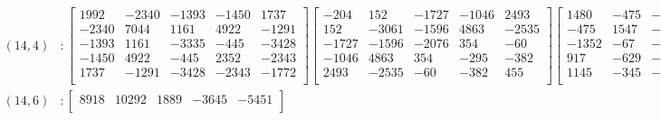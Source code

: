 \documentclass[12pt]{amsart}
\theoremstyle{plain}
\theoremstyle{definition}
\begin{document}
\begin{landscape}
\thispagestyle{empty}
\tiny
\begin{align*} 
(14,4) &:
\begin{bmatrix}
1992  &   -2340  &   -1393  &   -1450  &   1737  \\ 
 -2340  &   7044  &   1161  &   4922  &   -1291  \\ 
 -1393  &   1161  &   -3335  &   -445  &   -3428  \\ 
 -1450  &   4922  &   -445  &   2352  &   -2343  \\ 
 1737  &   -1291  &   -3428  &   -2343  &   -1772  \\ 
\end{bmatrix}
\begin{bmatrix}
-204  &   152  &   -1727  &   -1046  &   2493  \\ 
 152  &   -3061  &   -1596  &   4863  &   -2535  \\ 
 -1727  &   -1596  &   -2076  &   354  &   -60  \\ 
 -1046  &   4863  &   354  &   -295  &   -382  \\ 
 2493  &   -2535  &   -60  &   -382  &   455  \\ 
\end{bmatrix}
\begin{bmatrix}
1480  &   -475  &   -1352  &   917  &   1145  \\ 
 -475  &   1547  &   -67  &   -629  &   -345  \\ 
 -1352  &   -67  &   -1450  &   -3  &   -848  \\ 
 917  &   -629  &   -3  &   -8830  &   198  \\ 
 1145  &   -345  &   -848  &   198  &   458  \\ 
\end{bmatrix}
\begin{bmatrix}
-1925  &   1116  &   1104  &   1084  &   -1535  \\ 
 1116  &   -2677  &   640  &   -1955  &   1028  \\ 
 1104  &   640  &   721  &   240  &   225  \\ 
 1084  &   -1955  &   240  &   -1477  &   948  \\ 
 -1535  &   1028  &   225  &   948  &   -1084  \\ 
\end{bmatrix}
\\
(14,6) &:
\begin{bmatrix}
8918  &   10292  &   1889  &   -3645  &   -5451  \\ 

\end{bmatrix}
\end{align*}
\end{landscape}
\end{document}
